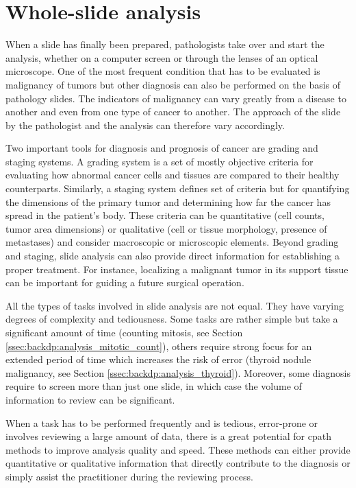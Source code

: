 \section{Whole-slide analysis}
\label{sec:backdp:typicalanalysistasks}


When a slide has finally been prepared, pathologists take over and start the analysis, whether on a computer screen or through the lenses of an optical microscope. One of the most frequent condition that has to be evaluated is malignancy of tumors but other diagnosis can also be performed on the basis of pathology slides. The indicators of malignancy can vary greatly from a disease to another and even from one type of cancer to another. The approach of the slide by the pathologist and the analysis can therefore vary accordingly. 

Two important tools for diagnosis and prognosis of cancer are grading and staging systems. A grading system is a set of mostly objective criteria for evaluating how abnormal cancer cells and tissues are compared to their healthy counterparts. Similarly, a staging system defines set of criteria but for quantifying the dimensions of the primary tumor and determining how far the cancer has spread in the patient's body. These criteria can be quantitative (\eg cell counts, tumor area dimensions) or qualitative (\eg cell or tissue morphology, presence of metastases) and consider macroscopic or microscopic elements. Beyond grading and staging, slide analysis can also provide direct information for establishing a proper treatment. For instance, localizing a malignant tumor in its support tissue can be important for guiding a future surgical operation. 

All the types of tasks involved in slide analysis are not equal. They have varying degrees of complexity and tediousness. Some tasks are rather simple but take a significant amount of time (\eg counting mitosis, see Section \ref{ssec:backdp:analysis_mitotic_count}), others require strong focus for an extended period of time which increases the risk of error (\eg thyroid nodule malignancy, see Section \ref{ssec:backdp:analysis_thyroid}). Moreover, some diagnosis require to screen more than just one slide, in which case the volume of information to review can be significant. 

When a task has to be performed frequently and is tedious, error-prone or involves reviewing a large amount of data, there is a great potential for \acrlong{cpath} methods to improve analysis quality and speed. These methods can either provide quantitative or qualitative information that directly contribute to the diagnosis or simply assist the practitioner during the reviewing process. %

